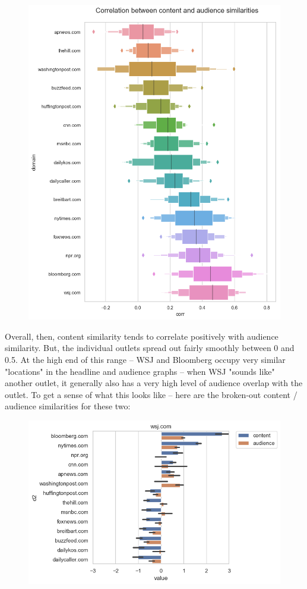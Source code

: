 \documentclass{scrartcl}
\begin{document}
\begin{figure}[H]
  \centering
  \includegraphics[height=0.7\textheight]{figures/ca-corr.png}
\end{figure}

Overall, then, content similarity tends to correlate positively with audience similarity. But, the individual outlets spread out fairly smoothly between 0 and 0.5. At the high end of this range -- WSJ and Bloomberg occupy very similar "locations" in the headline and audience graphs -- when WSJ "sounds like" another outlet, it generally also has a very high level of audience overlap with the outlet. To get a sense of what this looks like -- here are the broken-out content / audience similarities for these two:

\begin{figure}[H]
  \centering
  \includegraphics[width=\textwidth]{figures/ca-wsj-composite.png}
\end{figure}
\end{document}
